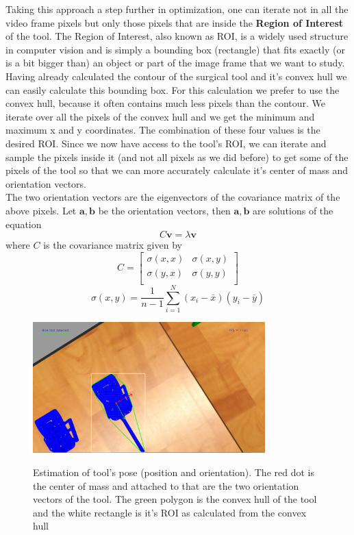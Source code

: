 Taking this approach a step further in optimization, one can iterate not in all the video frame pixels but only those pixels 
that are inside the \textbf{Region of Interest} of the tool. The Region of Interest, also known as ROI, is a widely used structure in computer vision and is simply a bounding box (rectangle) that fits exactly 
(or is a bit bigger than) an object or part of the image frame that we want to study. Having already calculated the contour of the surgical tool and it's convex hull we can easily calculate this bounding box. 
For this calculation we prefer to use the convex hull, because it often contains much less pixels than the contour. We iterate over all the pixels of the convex hull and we get the minimum and maximum x and y 
coordinates. The combination of these four values is the desired ROI. Since we now have access to the tool's ROI, we can iterate and sample the pixels inside it (and not all pixels as we did before) to get 
some of the pixels of the tool so that we can more accurately calculate it's center of mass and orientation vectors. \\

The two orientation vectors are the eigenvectors of the covariance matrix of the above pixels. Let $\mathbf{a},\mathbf{b}$ be the orientation vectors, 
then $\mathbf{a},\mathbf{b}$ are solutions of the equation
\[
C \mathbf{v} = λ \mathbf{v}
\]
where $C$ is the covariance matrix given by
\[
C = \begin{bmatrix}
σ(x,x) & σ(x,y) \\
σ(y,x) & σ(y,y) \\
\end{bmatrix}
\]
\[
σ(x,y) = \frac{1}{n-1} \sum_{i=1}^{N} ( x_i - \bar{x} )( y_i - \bar{y} )
\]

\begin{center}
\begin{figure}[H]
\centering
\includegraphics[width=0.8\textwidth]{images/tool-pose.png}\\
\caption{Estimation of tool's pose (position and orientation). The red dot is the center of mass and attached to that are the two orientation vectors of the tool. The green polygon is the convex hull of the tool 
and the white rectangle is it's ROI as calculated from the convex hull}
\end{figure}
\end{center}

